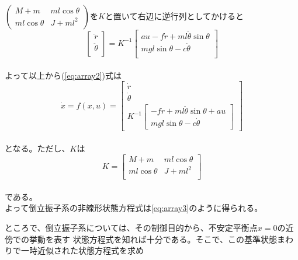 	\\
	$\begin{pmatrix} M + m & ml\cos{\theta} \\ ml\cos{\theta} & J + ml^{2} \end{pmatrix}$を$K$と置いて右辺に逆行列としてかけると\\
	\begin{equation}
		\left[
		\begin{array}{ccc}
			\ddot{r}\\
			\ddot{\theta}\\
		\end{array}
		\right]=K^{-1}
		\left[
		\begin{array}{ccc}
			au-f\dot{r}+ml\ddot{\theta}\sin{\theta}\\
			mgl\sin{\theta} - c\dot{\theta}\\
		\end{array}
		\right]
	\end{equation}
	\\
	よって以上から(\ref{eq:array2})式は\\
	\begin{equation}
		\dot{x} = f(x,u)=\left[
		\begin{array}{ccc}
			\dot{r}\\
			\dot{\theta}\\
			K^{-1}\left[
			\begin{array}{ccc}
				-f\dot{r}+ml\ddot{\theta}\sin{\theta}+au\\
				mgl\sin{\theta}-c\dot{\theta}
			\end{array}
			\right]
		\end{array}
		\right]
		\label{eq:array3}
	\end{equation}
	\\
	となる。ただし、$K$は
	\begin{equation}
		K=\left[
		\begin{array}{ccc}
			M+m & ml\cos{\theta}\\
			ml\cos{\theta} & J+ml^{2}\\
		\end{array}
		\right]
		\label{eq:array4}
	\end{equation}
	\\
	である。
	\\
	よって倒立振子系の非線形状態方程式は\ref{eq:array3}のように得られる。
	\par
	ところで、倒立振子系については、その制御目的から、不安定平衡点$x=0$の近傍での挙動を表す
	状態方程式を知れば十分である。そこで、この基準状態まわりで一時近似された状態方程式を求め
